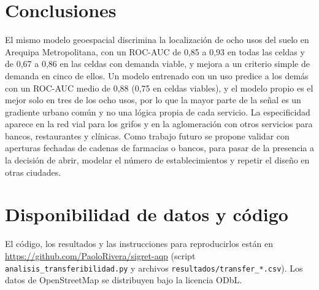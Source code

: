 \documentclass[10pt,letterpaper,twocolumn]{article}
\begin{document}
\section{Conclusiones}

El mismo modelo geoespacial discrimina la localización de ocho usos del suelo en Arequipa Metropolitana, con un ROC-AUC de 0,85 a 0,93 en todas las celdas y de 0,67 a 0,86 en las celdas con demanda viable, y mejora a un criterio simple de demanda en cinco de ellos. Un modelo entrenado con un uso predice a los demás con un ROC-AUC medio de 0,88 (0,75 en celdas viables), y el modelo propio es el mejor solo en tres de los ocho usos, por lo que la mayor parte de la señal es un gradiente urbano común y no una lógica propia de cada servicio. La especificidad aparece en la red vial para los grifos y en la aglomeración con otros servicios para bancos, restaurantes y clínicas. Como trabajo futuro se propone validar con aperturas fechadas de cadenas de farmacias o bancos, para pasar de la presencia a la decisión de abrir, modelar el número de establecimientos y repetir el diseño en otras ciudades.

\section*{Disponibilidad de datos y código}
El código, los resultados y las instrucciones para reproducirlos están en \url{https://github.com/PaoloRivera/sigret-aqp} (script \texttt{analisis\_transferibilidad.py} y archivos \texttt{resultados/transfer\_*.csv}). Los datos de OpenStreetMap se distribuyen bajo la licencia ODbL.
\end{document}

